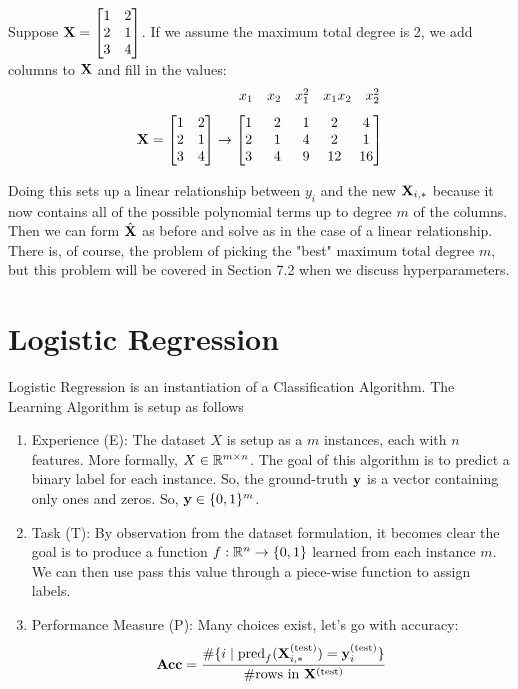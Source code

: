 \begin{example}
Suppose $\MX = \begin{bmatrix} 1&2\\2&1\\3&4 \end{bmatrix}$. If we assume the maximum total degree is 2, we add columns to $\MX$ and fill in the values:
$$ \phantom{.} \hspace{24mm} \begin{array}{*{5}{c}} x_1 & x_2 & x_1^2 & x_1 x_2 & x_2^2 \end{array} $$
\vspace{-25pt}
$$ \MX = \begin{bmatrix} 1&2\\2&1\\3&4 \end{bmatrix} \to
\begin{bmatrix}
1   &\phantom{..}2  &\phantom{..}1  &\phantom{.}2   &\phantom{.}4\\
2   &\phantom{..}1  &\phantom{..}4  &\phantom{.}2   &\phantom{.}1\\
3   &\phantom{..}4  &\phantom{..}9  &\phantom{.}12  &\phantom{.}16
\end{bmatrix} $$
\end{example}

Doing this sets up a linear relationship between $y_i$ and the new $\MX_{i, \ast}$ because it now contains all of the possible polynomial terms up to degree $m$ of the columns. Then we can form $\hat{\MX}$ as before and solve as in the case of a linear relationship. There is, of course, the problem of picking the "best" maximum total degree $m$, but this problem will be covered in Section 7.2 when we discuss hyperparameters.

\section{Logistic Regression}

Logistic Regression is an instantiation of a Classification Algorithm. The Learning Algorithm is setup as follows
\begin{enumerate}
    \item Experience (E): The dataset $X$ is setup as a $m$ instances, each with $n$ features. More formally, $X \in \R^{m \times n}$. The goal of this algorithm is to predict a binary label for each instance. So, the ground-truth $\vy$ is a vector containing only ones and zeros. So, $\vy \in \{0, 1\}^{m}$. 
    \item Task (T): By observation from the dataset formulation, it becomes clear the goal is to produce a function $f :  \R^{n} \to \{0, 1\}$ learned from each instance $m$. We can then use pass this value through a piece-wise function to assign labels. 
    \item Performance Measure (P): Many choices exist, let's go with accuracy:
    $$\textbf{Acc} = \frac {\#\{i \mid \text{pred}_f(\MX_{i, *}^{\text{(test)}}) = \vy_i^{\text{(test)}}\}}{\# \text{rows} \  \text{in} \ \MX^\text{(test)}}$$
\end{enumerate}

